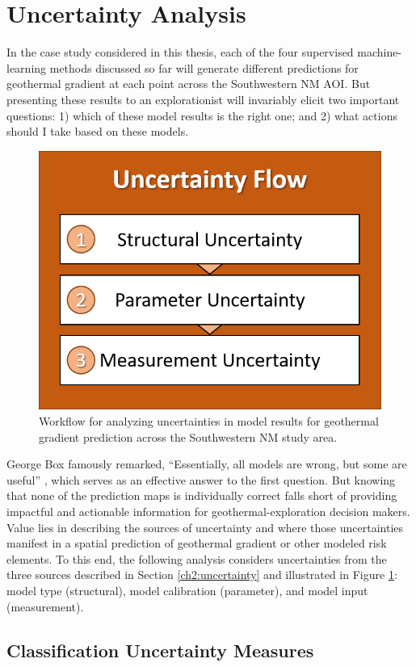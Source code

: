 \section{Uncertainty Analysis}\label{ch3:uncertainty_analysis}

In the case study considered in this thesis, each of the four supervised machine-learning methods discussed so far will generate different predictions for geothermal gradient at each point across the Southwestern NM AOI. But presenting these results to an explorationist will invariably elicit two important questions: 1) which of these model results is the right one; and 2) what actions should I take based on these models.

\begin{figure}[!htp]
\centering
\includegraphics[width=.35\linewidth]{templates/images/Flow-Uncertainty.png}
\singlespacing
\caption[Uncertainty analysis workflow]{Workflow for analyzing uncertainties in model results for geothermal gradient prediction across the Southwestern NM study area.}
\label{fig:uncertainty_flow}
\end{figure}

George Box famously remarked, ``Essentially, all models are wrong, but some are useful'' \citep{box_empirical_1987}, which serves as an effective answer to the first question. But knowing that none of the prediction maps is individually correct falls short of providing impactful and actionable information for geothermal-exploration decision makers. Value lies in describing the sources of uncertainty and where those uncertainties manifest in a spatial prediction of geothermal gradient or other modeled risk elements. To this end, the following analysis considers uncertainties from the three sources described in Section \ref{ch2:uncertainty} and illustrated in Figure \ref{fig:uncertainty_flow}: model type (structural), model calibration (parameter), and model input (measurement).

\subsection{Classification Uncertainty Measures}\label{ch3:uncertainty_measures}

